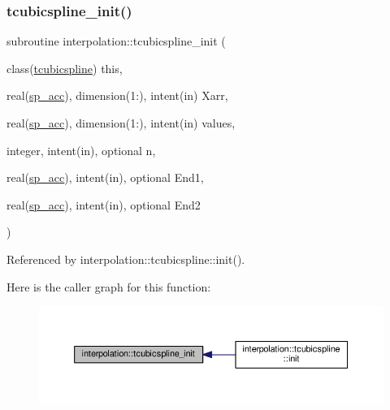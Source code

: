 \subsubsection{\texorpdfstring{tcubicspline\+\_\+init()}{tcubicspline\_init()}}
{\footnotesize\ttfamily subroutine interpolation\+::tcubicspline\+\_\+init (\begin{DoxyParamCaption}\item[{class(\mbox{\hyperlink{structinterpolation_1_1tcubicspline}{tcubicspline}})}]{this,  }\item[{real(\mbox{\hyperlink{namespaceinterpolation_af72aa9a05feb8ef90b2d26e4a013abf3}{sp\+\_\+acc}}), dimension(1\+:), intent(in)}]{Xarr,  }\item[{real(\mbox{\hyperlink{namespaceinterpolation_af72aa9a05feb8ef90b2d26e4a013abf3}{sp\+\_\+acc}}), dimension(1\+:), intent(in)}]{values,  }\item[{integer, intent(in), optional}]{n,  }\item[{real(\mbox{\hyperlink{namespaceinterpolation_af72aa9a05feb8ef90b2d26e4a013abf3}{sp\+\_\+acc}}), intent(in), optional}]{End1,  }\item[{real(\mbox{\hyperlink{namespaceinterpolation_af72aa9a05feb8ef90b2d26e4a013abf3}{sp\+\_\+acc}}), intent(in), optional}]{End2 }\end{DoxyParamCaption})}



Referenced by interpolation\+::tcubicspline\+::init().

Here is the caller graph for this function\+:
\nopagebreak
\begin{figure}[H]
\begin{center}
\leavevmode
\includegraphics[width=350pt]{namespaceinterpolation_a36b9a543d32de4944ae9289358f15a5a_icgraph}
\end{center}
\end{figure}
\mbox{\label{namespaceinterpolation_a7f58be276bbe7b10b95a7e156a4bc0b8}} 
